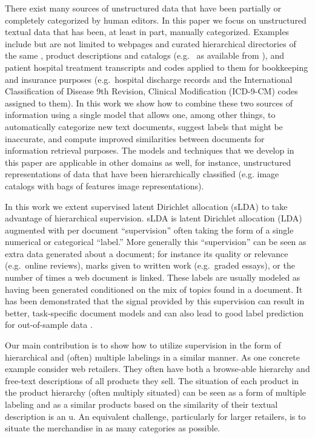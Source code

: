 There exist many sources of unstructured data that have been partially or completely categorized by human editors.  In this paper we focus on unstructured textual data that has been, at least in part, manually categorized.  Examples include but are not limited to webpages and curated hierarchical directories of the same \citep{DMOZ}, product descriptions and catalogs (e.g.~\citep{AMAZON} as available from \citep{SNAP}), and patient hospital treatment transcripts and  codes applied to them for bookkeeping and insurance purposes (e.g.~hospital discharge records and the International Classification of Disease 9th Revision,
Clinical Modification (ICD-9-CM) codes assigned to them\cite{}).  In this work we show how to combine these two sources of information using a single model that allows one, among other things, to automatically categorize new text documents, suggest labels that might be inaccurate, and compute improved similarities between documents for information retrieval purposes.  The models and techniques that we develop in this paper are applicable in other domains as well, for instance, unstructured representations of data that have been hierarchically classified (e.g. image catalogs with bags of features image representations). 

In this work we extent supervised latent Dirichlet allocation (sLDA) \cite{BleiMcAuliffe2008} to take advantage of hierarchical supervision.  sLDA is latent Dirichlet allocation (LDA) augmented with per document ``supervision''  often taking the form of a single numerical or categorical ``label.''  More generally this ``supervision'' can be seen as extra data generated about a document;  for instance its quality or relevance (e.g.~online reviews), marks given to written work (e.g.~graded essays), or the number of times a web document is linked.  These labels are usually modeled as having been generated conditioned on the mix of topics found in a document.  It has been demonstrated that the signal provided by this supervision can result in better, task-specific document models and can also lead to good label prediction for out-of-sample data \cite{}.

Our main contribution is to show how to utilize supervision in the form of  hierarchical and (often) multiple labelings in a similar manner.   As one concrete example consider web retailers.  They often have both a browse-able hierarchy and free-text descriptions of all products they sell.   The situation of each product in the product hierarchy (often multiply situated) can be seen as a form of multiple labeling and as a 
similar products based on the similarity of their textual description is an u.  An equivalent challenge, particularly for larger retailers, is to situate the merchandise in as many categories as possible. 

